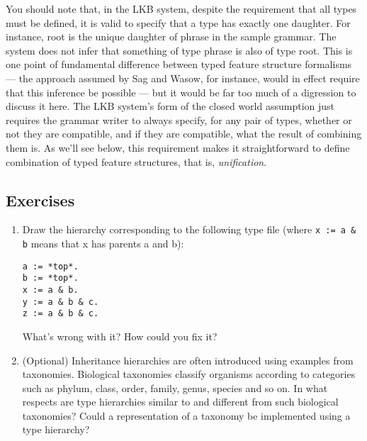 \documentclass[12pt]{report}
\newcommand{\newterm}[1]{{\it #1}}
\begin{document}
You should note that, in the LKB system, despite the requirement
that all types must be defined, it is valid to specify that
a type has exactly one daughter.  For instance, {\type root}
is the unique daughter of {\type phrase} in the
sample grammar.  The system does not infer that something of type
{\type phrase} is also of type {\type root}.  This is one point of
fundamental difference between typed feature structure formalisms
--- the approach assumed by Sag and Wasow, for instance, would
in effect require that this inference be possible ---
but it would be far too much of a digression to discuss it 
here.
The LKB system's form of the closed world assumption
just requires the grammar writer to always specify, 
for any pair of types, whether or
not they are compatible, and if they are compatible, what the result
of combining them is.  As we'll see below,
this requirement makes it straightforward to define combination of
typed feature structures, that is, \newterm{unification}.  

\subsection{Exercises}
\begin{enumerate}
\item Draw the hierarchy corresponding to 
the following type file (where
\verb+x := a & b+ means
that {\type x} has parents {\type a} and {\type b}):
\begin{verbatim}
a := *top*.
b := *top*.
x := a & b.
y := a & b & c.
z := a & b & c.
\end{verbatim}
What's wrong with it?  How could you fix it?
\item (Optional) Inheritance hierarchies are often introduced
using examples from taxonomies.
Biological taxonomies classify organisms
according to categories such as phylum, class, order, family, genus, species and
so on.  In what respects are type hierarchies similar to and different
from such
biological taxonomies?  Could a representation of a taxonomy
be implemented using a type hierarchy?
\end{enumerate}
\end{document}
